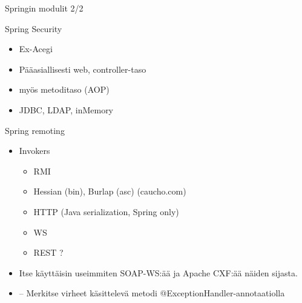 \documentclass[hyperref={pdfauthor=\AUTHOR},14pt]{beamer}
\begin{document}
\begin{frame}{Springin modulit 2/2}
\end{frame}

\begin{frame}{Spring Security}
\begin{itemize}
\item Ex-Acegi
\item Pääasiallisesti web, controller-taso
\item myös metoditaso (AOP)
\item JDBC, LDAP, inMemory
\end{itemize}
\end{frame}

\begin{frame}{Spring remoting}
\begin{itemize}
\item Invokers
\begin{itemize}
\item RMI
\item Hessian (bin), Burlap (asc) (caucho.com)
\item HTTP (Java serialization, Spring only)
\item WS
\item REST ?
\end{itemize}
\item Itse käyttäisin useimmiten SOAP-WS:ää ja Apache CXF:ää näiden
  sijasta.

\end{itemize}
\end{frame}


 \begin{frame}{}
 \begin{itemize}
 \item 
 -- Merkitse virheet käsittelevä metodi @ExceptionHandler-annotaatiolla
 \end{itemize}
  \end{frame}
\end{document}
